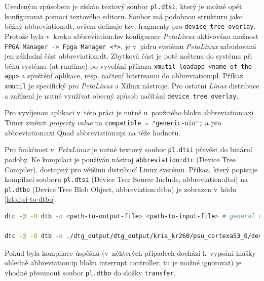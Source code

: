 \documentclass[a4paper, twoside, 11pt]{article}
\begin{document}
		Uvedeným způsobem je získán textový soubor \texttt{pl.dtsi}, který je možné opět konfigurovat pomocí textového editoru. Soubor má podobnou strukturu jako běžný \gls{abbreviation:dt}, ovšem definuje tzv. fragmenty pro \texttt{device tree overlay}. Protože byla v~kroku \gls{abbreviation:hw} konfigurace \textit{PetaLinux} aktivována možnost \texttt{FPGA Manager -> Fpga Manager <*>}, je v~jádru systému \textit{PetaLinux} zabudovaná jen základní část \gls{abbreviation:dt}. Zbytková část je poté načtena do systému při běhu systému (at runtime) po vyvolání příkazu \texttt{xmutil loadapp <name-of-the-app>} a spuštění aplikace, resp. načtení bitstreamu do \gls{abbreviation:pl}. Příkaz \texttt{xmutil} je specifický pro \textit{PetaLinux} a Xilinx nástroje. Pro ostatní \textit{Linux} distribuce a zařízení je nutné využívat obecný způsob načítání \texttt{device tree overlay}.\par
		Pro vyvíjenou aplikaci v~této práci je nutné u~použitého bloku \gls{abbreviation:axi} Timer
		změnit \textit{property value} na \texttt{compatible = "generic-uio";} a pro \gls{abbreviation:axi} Quad \gls{abbreviation:spi} na téže hodnotu.\par
		Pro funkčnost v~\textit{PetaLinux} je nutné textový soubor \texttt{pl.dtsi} převést do binární podoby. Ke kompilaci je používán nástroj \texttt{\gls{abbreviation:dtc}} (Device Tree Compiler), dostupný pro většinu distribucí Linux systému. Příkaz, který popisuje kompilaci souboru \texttt{pl.dtsi} (Device Tree Source Include, \gls{abbreviation:dtsi}) na \texttt{pl.dtbo} (Device Tree Blob Object, \gls{abbreviation:dtbo}) je zobrazen v~kódu \ref{lst:dtsi-to-dtbo}.\par

		\begin{lstlisting}[language={sh}, caption={Kompilace textového souboru device tree overlay pl.dtsi na binární pl.dtbo}, label= {lst:dtsi-to-dtbo}, morekeywords={dtc}]
dtc -@ -O dtb -o <path-to-output-file> <path-to-input-file> # general command

dtc -@ -O dtb -o ./dtg_output/dtg_output/kria_kr260/psu_cortexa53_0/device_tree_domain/bsp/pl.dtbo ./dtg_output/dtg_output/kria_kr260/psu_cortexa53_0/device_tree_domain/bsp/pl.dtsi # command for project file structure
\end{lstlisting}
	Pokud byla kompilace úspěšná (v~některých případech dochází k~vypsání hlášky ohledně \gls{abbreviation:ip} bloku interrupt controller, tu je možné ignorovat) je vhodné přesunout soubor \texttt{pl.dtbo} do složky \texttt{transfer}.
\end{document}
